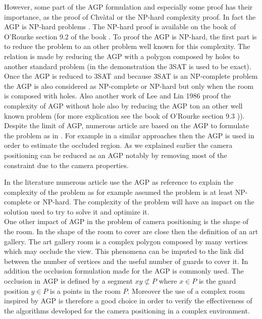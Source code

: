 However, some part of the AGP formulation and especially some proof has their importance, as the proof of Chvàtal \cite{44*chvatal1975} or the NP-hard complexity proof. 
In fact the AGP is NP-hard problems \cite{219*orourke1987}. The NP-hard proof is available on the book of O’Rourke section 9.2 of the book \cite{219*orourke1987}. 
To proof the AGP is  NP-hard, the first part is to reduce the  problem to an other problem well known for this complexity. The relation is made by reducing the AGP with a polygon composed by  holes to another standard problem (in the demonstration the 3SAT is used to be exact). 
Once the AGP is reduced to 3SAT and because 3SAT is an NP-complete problem the AGP is  also considered as NP-complete or  NP-hard but only  when the room is composed with holes. Also another work of Lee and Lin 1986 proof the complexity of AGP without hole also by reducing the AGP ton an other well known problem (for more explication see the book of O’Rourke  section 9.3 \cite{219*orourke1987})).
Despite the limit of AGP, numerous article are based on the AGP to formulate the problem as in \cite{43*erdem2006,53*packer2008}. For example in \cite{43*erdem2006} a similar approaches then the AGP is used in order to estimate the occluded region. 
As we explained earlier the camera positioning can be reduced as an AGP \cite{53*packer2008} notably by removing most of the constraint due to the camera properties. 

In the literature numerous article use the AGP as reference to explain the complexity of the problem as for example \cite{26*moeini,44*chvatal1975,149*mavrinac2013,151*zhao2013}  assumed the problem is at least NP-complete or NP-hard. 
The complexity of the problem will have an impact on the solution used  to try to solve it and optimize it.\\
One other impact of AGP in the problem of camera positioning is the shape of the room. In \cite{170*yabuta2008,171*horster2006,33*reddy2012,43*erdem2006} the shape of the room to cover are close then the definition of an art gallery. The art gallery room is a complex polygon composed by many vertices which may occlude the view. This phenomena can be imputed to the link did between the number of vertices and the useful number of guards to cover it. 
In addition the occlusion formulation made for the AGP is commonly used.
The occlusion in AGP is defined  by  a segment $xy \not\subset P$   where $x \in P$ is the guard position $y \in P$ is a points in the room $P$. 
Moreover the use of a complex room inspired by AGP is therefore a good choice in order to verify the effectiveness of the algorithms developed for the camera positioning in a complex environment.


